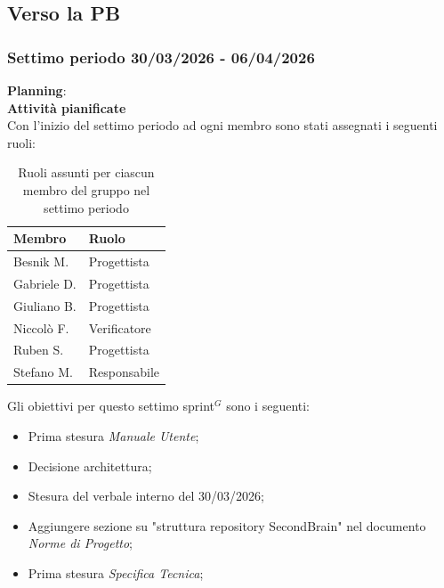\documentclass[a4paper,10pt]{article}
\begin{document}
\subsection{Verso la PB}

\subsubsection{Settimo periodo 30/03/2026 - 06/04/2026}
\textbf{Planning}: \\
\textbf{Attività pianificate} \\ Con l'inizio del settimo periodo ad ogni membro sono stati assegnati i seguenti ruoli:
\begin{table}[H]
\centering
\begin{tabular}{|l|l|}
\hline
\textbf{Membro} & \textbf{Ruolo} \\
\hline
Besnik M.  & Progettista \\
\hline
Gabriele D.  & Progettista \\
\hline
Giuliano B. & Progettista \\
\hline
Niccolò F. & Verificatore \\
\hline
Ruben S. & Progettista \\
\hline
Stefano M.  & Responsabile \\
\hline
\end{tabular}
\caption{Ruoli assunti per ciascun membro del gruppo nel settimo periodo}
\end{table}

Gli obiettivi per questo settimo sprint$^G$ sono i seguenti:
\begin{itemize}
  \item Prima stesura \textit{Manuale Utente};
  \item Decisione architettura;
  \item Stesura del verbale interno del 30/03/2026;
  \item Aggiungere sezione su "struttura repository SecondBrain" nel documento \textit{Norme di Progetto};
  \item Prima stesura \textit{Specifica Tecnica};
\end{itemize}
\end{document}
